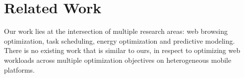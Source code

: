 \section{Related Work}
Our work lies at the intersection of multiple research areas: web browsing optimization, task scheduling, energy optimization and predictive modeling. There is no existing work that is similar to ours, in respect to optimizing web workloads across multiple optimization objectives on heterogeneous mobile platforms.

